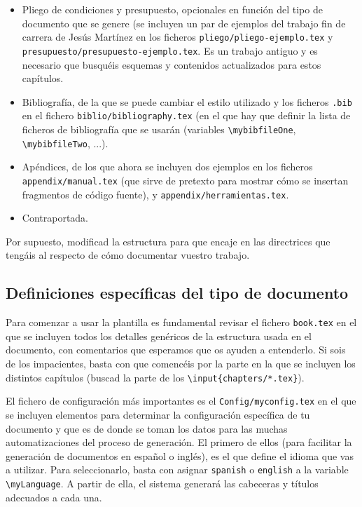 \documentclass[spanish,openright]{book}
\begin{document}
\begin{itemize}
\item Pliego de condiciones y presupuesto, opcionales en función del
  tipo de documento que se genere (se incluyen un
  par de ejemplos del trabajo fin de carrera de Jesús Martínez en los
  ficheros \texttt{pliego/pliego-ejemplo.tex} y
  \texttt{presupuesto/presupuesto-ejemplo.tex}. Es un trabajo antiguo y
  es necesario que busquéis esquemas y contenidos actualizados para
  estos capítulos.

\item Bibliografía, de la que se puede cambiar el estilo utilizado y los
  ficheros \texttt{.bib} en el fichero
  \texttt{biblio/bibliography.tex} (en el que hay que definir la lista
  de ficheros de bibliografía que se usarán (variables
  \texttt{\textbackslash{}mybibfileOne},
  \texttt{\textbackslash{}mybibfileTwo}, ...).

\item Apéndices, de los que ahora se incluyen dos ejemplos en los
  ficheros \texttt{appendix/manual.tex} (que sirve de pretexto para
  mostrar cómo se insertan fragmentos de código fuente), y
  \texttt{appendix/herramientas.tex}.
\item Contraportada.
\end{itemize}

Por supuesto, modificad la estructura para que encaje en las directrices
que tengáis al respecto de cómo documentar vuestro trabajo.


\subsection{Definiciones específicas del tipo de documento}
\label{sec:definicion-del-tipo}

Para comenzar a usar la plantilla es fundamental revisar el fichero
\texttt{book.tex} en el que se incluyen todos los detalles genéricos de
la estructura usada en el documento, con comentarios que esperamos que
os ayuden a entenderlo. Si sois de los impacientes, basta con que
comencéis por la parte en la que se incluyen los distintos capítulos
(buscad la parte de los \texttt{\textbackslash{}input\{chapters/*.tex\}}).

El fichero de configuración más importantes es el
\texttt{Config/myconfig.tex} en el que se incluyen elementos para
determinar la configuración específica de tu documento y que es de
donde se toman los datos para las muchas automatizaciones del proceso
de generación. El primero de ellos (para facilitar la generación de
documentos en español o inglés), es el que define el idioma que vas a
utilizar. Para seleccionarlo, basta con asignar \texttt{spanish} o
\texttt{english} a la variable \texttt{\textbackslash{}myLanguage}. A
partir de ella, el sistema generará las cabeceras y títulos adecuados
a cada una.
\end{document}

